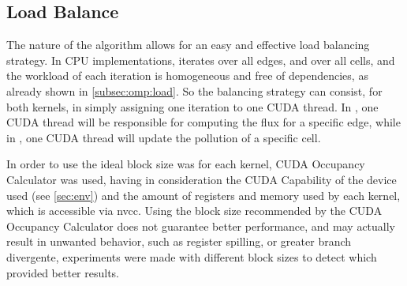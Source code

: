 \subsection{Load Balance}
\label{subsec:cuda:load}

The nature of the algorithm allows for an easy and effective load balancing strategy. In CPU implementations, \computeflux iterates over all edges, and \update over all cells, and the workload of each iteration is homogeneous and free of dependencies, as already shown in \cref{subsec:omp:load}. So the balancing strategy can consist, for both kernels, in simply assigning one iteration to one CUDA thread. In \computeflux, one CUDA thread will be responsible for computing the flux for a specific edge, while in \update, one CUDA thread will update the pollution of a specific cell.

In order to use the ideal block size was for each kernel, CUDA Occupancy Calculator \cite{cuda_documentation} was used, having in consideration the CUDA Capability of the device used (see \cref{sec:env}) and the amount of registers and memory used by each kernel, which is accessible via nvcc. Using the block size recommended by the CUDA Occupancy Calculator does not guarantee better performance, and may actually result in unwanted behavior, such as register spilling, or greater branch divergente, experiments were made with different block sizes to detect which provided better results.
